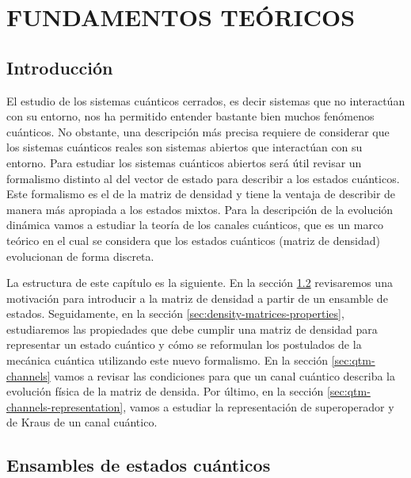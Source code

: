 \chapter{FUNDAMENTOS TEÓRICOS}
\section{Introducción} %
El estudio de los sistemas cuánticos cerrados, es decir sistemas que no
interactúan con su entorno, nos ha permitido entender bastante bien muchos
fenómenos cuánticos. No obstante, una descripción más precisa 
requiere de considerar que los sistemas cuánticos reales son sistemas abiertos
que interactúan con su entorno. Para estudiar los 
sistemas cuánticos abiertos será útil revisar un formalismo distinto
al del vector de estado para describir a los estados cuánticos. 
Este formalismo es el de la matriz de densidad y tiene la ventaja 
de describir de manera más apropiada a los estados mixtos. 
Para la descripción de la evolución dinámica  
vamos a estudiar la teoría de los canales cuánticos, 
que es un marco teórico en el cual se considera que los estados 
cuánticos (matriz de densidad) evolucionan de forma discreta.

La estructura de este capítulo es la siguiente.
En la sección \ref{sec:ensambles} revisaremos una motivación para introducir 
a la matriz de densidad a partir de un ensamble de estados. 
Seguidamente, en la sección \ref{sec:density-matrices-properties},
estudiaremos las propiedades que debe cumplir una matriz 
de densidad para representar un estado cuántico
y cómo se reformulan los postulados 
de la mecánica cuántica utilizando este nuevo formalismo.
En la sección \ref{sec:qtm-channels} vamos a revisar las
condiciones para que un canal cuántico describa la evolución 
física de la matriz de densida. Por último, en la sección
\ref{sec:qtm-channels-representation}, vamos a estudiar 
la representación de superoperador y de Kraus de un canal cuántico.

\section{Ensambles de estados cuánticos} \label{sec:ensambles} %

